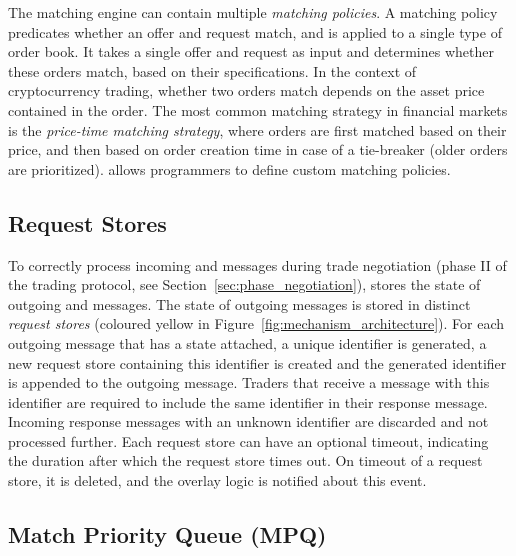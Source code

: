 The matching engine can contain multiple \emph{matching policies}.
A matching policy predicates whether an offer and request match, and is applied to a single type of order book.
It takes a single offer and request as input and determines whether these orders match, based on their specifications.
In the context of cryptocurrency trading, whether two orders match depends on the asset price contained in the order.
The most common matching strategy in financial markets is the \emph{price-time matching strategy}, where orders are first matched based on their price, and then based on order creation time in case of a tie-breaker (older orders are prioritized).
\ModelName{} allows programmers to define custom matching policies.

\subsection{Request Stores}
To correctly process incoming \MsgTrdAccept{} and \MsgTrdReject{} messages during trade negotiation (phase II of the \ModelName{} trading protocol, see Section~\ref{sec:phase_negotiation}), \ModelName{} stores the state of outgoing \MsgTrdProp{} and \MsgTrdNegotiate{} messages.
The state of outgoing messages is stored in distinct \emph{request stores} (coloured yellow in Figure~\ref{fig:mechanism_architecture}).
For each outgoing message that has a state attached, a unique identifier is generated, a new request store containing this identifier is created and the generated identifier is appended to the outgoing message.
Traders that receive a message with this identifier are required to include the same identifier in their response message.
Incoming response messages with an unknown identifier are discarded and not processed further.
Each request store can have an optional timeout, indicating the duration after which the request store times out.
On timeout of a request store, it is deleted, and the overlay logic is notified about this event.

\subsection{Match Priority Queue (MPQ)} 
\label{subsec:match_priority_queue}

